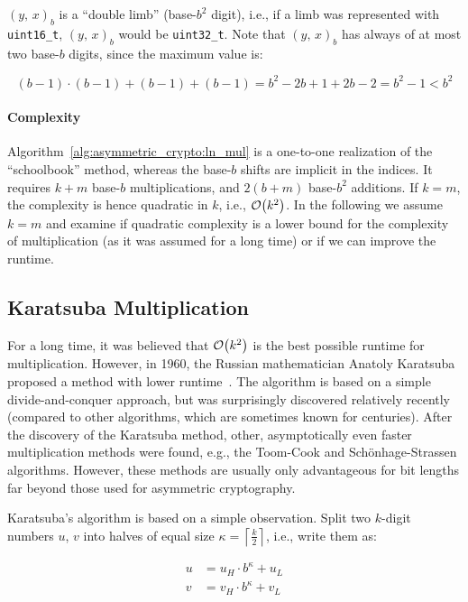 $\left(y,\,x\right)_b$ is a ``double limb'' (base-$b^2$ digit), i.e., if a limb was represented with \verb+uint16_t+, $\left(y,\,x\right)_b$ would be \verb+uint32_t+.
Note that  $\left(y,\,x\right)_b$ has always of at most two base-$b$ digits, since the maximum value is:

$$
\left(b-1\right) \cdot \left(b-1\right) + \left(b-1\right) + \left(b-1\right) = b^2 - 2b + 1 + 2b - 2 = b^2 - 1 < b^2
$$

\paragraph{Complexity}
Algorithm~\ref{alg:asymmetric_crypto:ln_mul} is a one-to-one realization of the ``schoolbook'' method, whereas the base-$b$ shifts are implicit in the indices. It requires $k + m$ base-$b$ multiplications, and $2\left(b+m\right)$ base-$b^2$ additions. If $k = m$, the complexity is hence quadratic in $k$, i.e., $\mathcal{O}{\left(k^2\right)}$. In the following we assume $k = m$ and examine if quadratic complexity is a lower bound for the complexity of multiplication (as it was assumed for a long time) or if we can improve the runtime.

\subsection{Karatsuba Multiplication}
For a long time, it was believed that $\mathcal{O}{\left(k^2\right)}$ is the best possible runtime for multiplication. However, in 1960, the Russian mathematician Anatoly Karatsuba proposed a method with lower runtime~\cite{karatsubaMul}. The algorithm is based on a simple divide-and-conquer approach, but was surprisingly discovered relatively recently (compared to other algorithms, which are sometimes known for centuries). After the discovery of the Karatsuba method, other, asymptotically even faster multiplication methods were found, e.g., the Toom-Cook and Schönhage-Strassen algorithms. However, these methods are usually only advantageous for bit lengths far beyond those used for asymmetric cryptography.

Karatsuba's algorithm is based on a simple observation. Split two $k$-digit numbers $u$, $v$ into halves of equal size $\kappa = \left\lceil \frac{k}{2} \right\rceil$, i.e., write them as:

\begin{align}
	u &= u_H \cdot b^\kappa + u_L \nonumber \\ 
	v &= v_H \cdot b^\kappa + v_L \nonumber 
\end{align}

